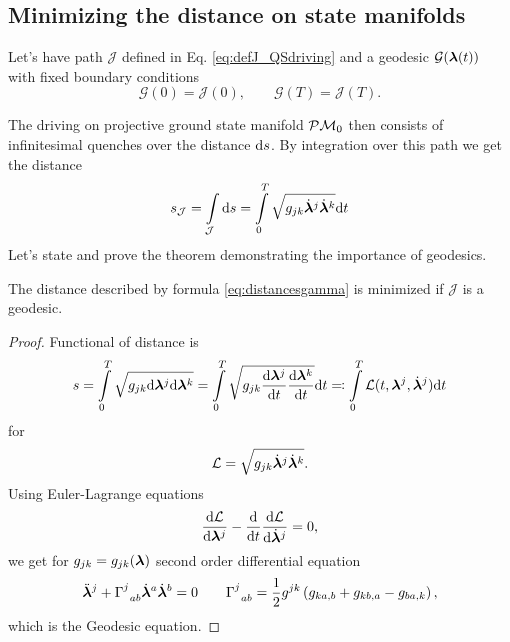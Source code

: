 \subsection{Minimizing the distance on state manifolds}
Let's have path $\mathcal J$ defined in Eq. \ref{eq:defJ_QSdriving} and a geodesic $\mathcal G({\bm\lambda}(t))$ with fixed boundary conditions
 $$\mathcal{G}(0)=\mathcal J(0),\qquad \mathcal{G}(T)=\mathcal J(T).$$

The driving on projective ground state manifold $\mathcal{P}\mathcal{M}_0$ then consists of infinitesimal quenches over the distance $\mathrm{d} s$. By integration over this path we get the distance
\begin{equation}
    s_{\mathcal J}=\int\limits_{\mathcal J}\mathrm{d} s=\int\limits_{0}^{T}\sqrt{g_{jk}\dot{{\bm\lambda}}^j\dot{{\bm\lambda}}^k}\mathrm{d} t
    \label{eq:distancesgamma}
\end{equation}
Let's state and prove the theorem demonstrating the importance of geodesics.
\begin{thm}
    The distance described by formula \ref{eq:distancesgamma} is minimized if $\mathcal J$ is a geodesic.
\end{thm}

\begin{proof}
    Functional of distance is
    \begin{equation}
        s=\int\limits_0^{T} \sqrt{g_{jk}\mathrm{d}{\bm\lambda}^j\mathrm{d}{\bm\lambda}^k}=\int\limits_0^{T} \sqrt{g_{jk}\frac{\mathrm{d} {\bm\lambda}^j}{\mathrm{d} t}\frac{\mathrm{d} {\bm\lambda}^k}{\mathrm{d} t}}\mathrm{d} t \eqqcolon \int\limits_0^{T} \mathcal{L}(t,{\bm\lambda}^j,\dot{{\bm\lambda}}^j)\mathrm{d} t
    \end{equation}
    for 
    \begin{equation}
        \mathcal{L}=\sqrt{g_{jk}\dot{{\bm\lambda}}^j\dot{{\bm\lambda}}^k}.
    \end{equation}
    Using Euler-Lagrange equations 
    \begin{equation}
        \frac{\mathrm{d} \mathcal{L}}{\mathrm{d} {\bm\lambda}^j}-\frac{\mathrm{d} }{\mathrm{d} t}\frac{\mathrm{d} \mathcal{L}}{\mathrm{d} \dot{{\bm\lambda}}^j}=0,
    \end{equation}
    we get for $g_{jk}=g_{jk}({\bm\lambda})$ second order differential equation
    \begin{equation}
        \ddot{{\bm\lambda}}^j+\Gamma^j_{\;\;ab}\dot{{\bm\lambda}}^a\dot{{\bm\lambda}}^b=0\qquad \Gamma^j_{\;\;ab}=\frac{1}{2}g^{jk}\left(g_{ka,b}+g_{kb,a}-g_{ba,k}\right),
        \label{eq:geodesicEquaiton}
    \end{equation}
    which is the Geodesic equation.
\end{proof}




